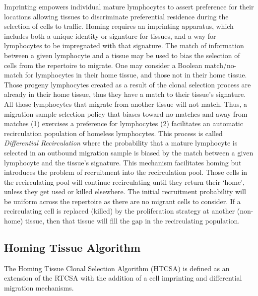 Imprinting empowers individual mature lymphocytes to assert preference for their locations allowing tissues to discriminate preferential residence during the selection of cells to traffic. Homing requires an imprinting apparatus, which includes both a unique identity or signature for tissues, and a way for lymphocytes to be impregnated with that signature. The match of information between a given lymphocyte and a tissue may be used to bias the selection of cells from the repertoire to migrate. One may consider a Boolean match/no-match for lymphocytes in their home tissue, and those not in their home tissue. Those progeny lymphocytes created as a result of the clonal selection process are already in their home tissue, thus they have a match to their tissue's signature. All those lymphocytes that migrate from another tissue will not match. Thus, a migration sample selection policy that biases toward no-matches and away from matches (1) exercises a preference for lymphocytes (2) facilitates an automatic recirculation population of homeless lymphocytes. This process is called \emph{Differential Recirculation} where the probability that a mature lymphocyte is selected in an outbound migration sample is biased by the match between a given lymphocyte and the tissue's signature. This mechanism facilitates homing but introduces the problem of recruitment into the recirculation pool. Those cells in the recirculating pool will continue recirculating until they return their `home', unless they get used or killed elsewhere. The initial recruitment probability will be uniform across the repertoire as there are no migrant cells to consider. If a recirculating cell is replaced (killed) by the proliferation strategy at another (non-home) tissue, then that tissue will fill the gap in the recirculating population. 

%
%
\subsection{Homing Tissue Algorithm}
The Homing Tissue Clonal Selection Algorithm (HTCSA) is defined as an extension of the RTCSA with the addition of a cell imprinting and differential migration mechanisms. 

%
%
